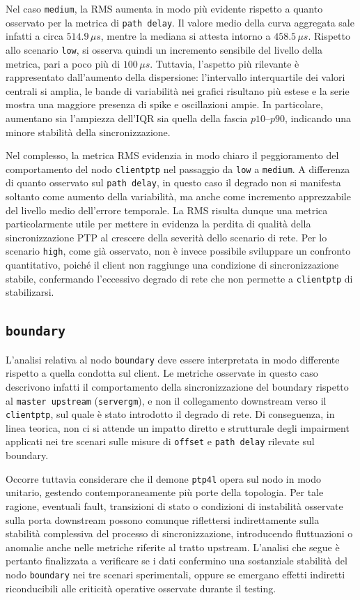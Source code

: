 Nel caso \texttt{medium}, la RMS aumenta in modo più evidente rispetto a quanto osservato
per la metrica di \texttt{path delay}. Il valore medio della curva aggregata sale
infatti a circa $514.9\,\mu s$, mentre la mediana si attesta intorno a
$458.5\,\mu s$. Rispetto allo scenario \texttt{low}, si osserva quindi un incremento
sensibile del livello della metrica, pari a poco più di $100\,\mu s$. Tuttavia,
l’aspetto più rilevante è rappresentato dall’aumento della dispersione: l’intervallo
interquartile dei valori centrali si amplia, le bande di variabilità nei grafici
risultano più estese e la serie mostra una maggiore presenza di spike e
oscillazioni ampie. In particolare, aumentano sia l’ampiezza dell’IQR sia quella
della fascia $p10$--$p90$, indicando una minore stabilità della sincronizzazione.

Nel complesso, la metrica RMS evidenzia in modo chiaro il peggioramento del comportamento
del nodo \texttt{clientptp} nel passaggio da \texttt{low} a \texttt{medium}. A differenza
di quanto osservato sul \texttt{path delay}, in questo caso il degrado non si manifesta
soltanto come aumento della variabilità, ma anche come incremento apprezzabile
del livello medio dell’errore temporale. La RMS risulta dunque una metrica particolarmente
utile per mettere in evidenza la perdita di qualità della sincronizzazione PTP al
crescere della severità dello scenario di rete. Per lo scenario \texttt{high},
come già osservato, non è invece possibile sviluppare un confronto quantitativo,
poiché il client non raggiunge una condizione di sincronizzazione stabile, confermando
l'eccessivo degrado di rete che non permette a \texttt{clientptp} di
stabilizarsi.

\subsection{\texttt{boundary}}
L'analisi relativa al nodo \texttt{boundary} deve essere interpretata in modo differente
rispetto a quella condotta sul client. Le metriche osservate in questo caso
descrivono infatti il comportamento della sincronizzazione del boundary rispetto
al \texttt{master upstream} (\texttt{servergm}), e non il collegamento downstream
verso il \texttt{clientptp}, sul quale è stato introdotto il degrado di rete. Di
conseguenza, in linea teorica, non ci si attende un impatto diretto e
strutturale degli impairment applicati nei tre scenari sulle misure di \texttt{offset}
e \texttt{path delay} rilevate sul boundary.

Occorre tuttavia considerare che il demone \texttt{ptp4l} opera sul nodo in modo unitario,
gestendo contemporaneamente più porte della topologia. Per tale ragione,
eventuali fault, transizioni di stato o condizioni di instabilità osservate sulla
porta downstream possono comunque riflettersi indirettamente sulla stabilità complessiva
del processo di sincronizzazione, introducendo fluttuazioni o anomalie anche
nelle metriche riferite al tratto upstream. L'analisi che segue è pertanto finalizzata
a verificare se i dati confermino una sostanziale stabilità del nodo \texttt{boundary}
nei tre scenari sperimentali, oppure se emergano effetti indiretti riconducibili alle
criticità operative osservate durante il testing.

